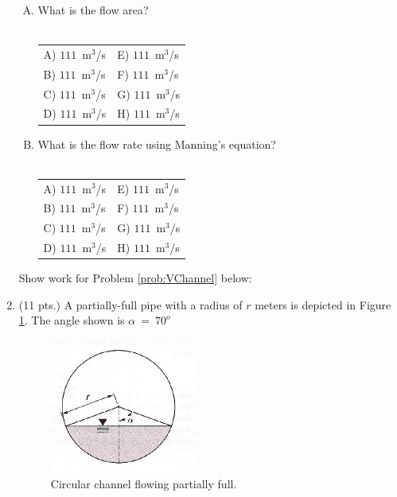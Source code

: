 \documentclass[11pt]{article}
\begin{document}
\begin{enumerate}
\begin{enumerate}[A)]
\item What is the flow area?\\~\\
\begin{tabular}{p{2in} p{2in}  } 
A) $111$~m$^3$/s & E) $111$~m$^3$/s \\ 
B) $111$~m$^3$/s & F) $111$~m$^3$/s  \\
C) $111$~m$^3$/s & G) $111$~m$^3$/s  \\
D) $111$~m$^3$/s & H) $111$~m$^3$/s  \\
\end{tabular}

\item What is the flow rate using Manning's equation?\\~\\
\begin{tabular}{p{2in} p{2in}  } 
A) $111$~m$^3$/s & E) $111$~m$^3$/s \\ 
B) $111$~m$^3$/s & F) $111$~m$^3$/s  \\
C) $111$~m$^3$/s & G) $111$~m$^3$/s  \\
D) $111$~m$^3$/s & H) $111$~m$^3$/s  \\
\end{tabular}

\end{enumerate}

Show work for Problem \ref{prob:VChannel} below:
\clearpage
\item  (11 pts.) \label{prob:CircularSewer}
A partially-full pipe with a radius of $r$ meters is depicted in Figure \ref{fig:CircularSewer}.
The angle shown is $\alpha~=~ 70^o$

\begin{figure}[h!] %
\centering
   \includegraphics[width=1.9in]{CircularSewer.jpg}
   \caption{Circular channel flowing partially full.}
   \label{fig:CircularSewer} 
\end{figure}


\end{enumerate}
\end{document}
